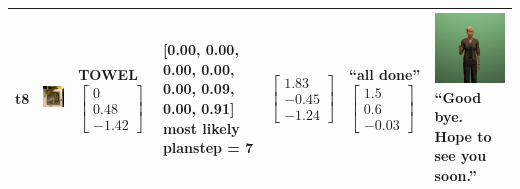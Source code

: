 \begin{longtable}{| V{0.8cm} | V{2.6cm} | V{1.6cm} | V{2.1cm} | V{1.55cm} | V{1.6cm} | V{3.2cm} |}
t8 &
\includegraphics[width=\linewidth]{fig/system/_slow2-towel_.jpg} &
TOWEL
\linebreak\linebreak
$\begin{bmatrix}
0 \\
0.48 \\
-1.42
\end{bmatrix}$ &
[0.00, 0.00, 0.00, 0.00, 0.00, 0.09, 0.00, 0.91] most likely planstep = 7 &
$\begin{bmatrix}
1.83 \\
-0.45 \\
-1.24
\end{bmatrix}$ &
``all done''
\linebreak\linebreak
$\begin{bmatrix}
1.5 \\
0.6 \\
-0.03
\end{bmatrix}$ &
\includegraphics[width=2.6cm]{fig/prompt/_hope-to-see-you-soon_.jpg}
\linebreak
\footnotesize
``Good bye. Hope to see you soon.''
\\ \hline

\end{longtable}



